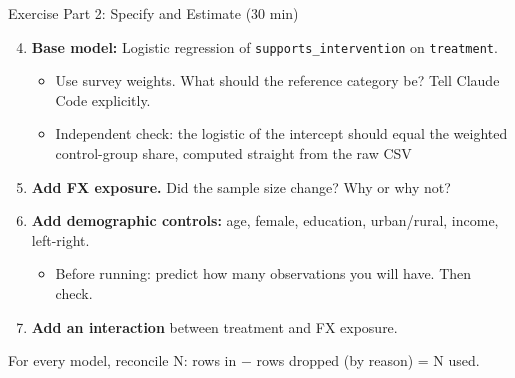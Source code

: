
\begin{frame}{Exercise Part 2: Specify and Estimate (30 min)}
  \begin{enumerate}
    \setcounter{enumi}{3}
    \item \textbf{Base model:} Logistic regression of \texttt{supports\_intervention} on \texttt{treatment}.
    \begin{itemize}
      \small
      \item Use survey weights. What should the reference category be? Tell Claude Code explicitly.
      \item \alert{Independent check:} the logistic of the intercept should equal the weighted control-group share, computed straight from the raw CSV
    \end{itemize}

    \vspace{0.2em}
    \item \textbf{Add FX exposure.} Did the sample size change? Why or why not?

    \vspace{0.2em}
    \item \textbf{Add demographic controls:} age, female, education, urban/rural, income, left-right.
    \begin{itemize}
      \small
      \item \alert{Before running: predict how many observations you will have.} Then check.
    \end{itemize}

    \vspace{0.2em}
    \item \textbf{Add an interaction} between treatment and FX exposure.
  \end{enumerate}

  \vspace{0.4em}
  {\small \alert{For every model, reconcile N:} rows in $-$ rows dropped (by reason) = N used.}
\end{frame}

